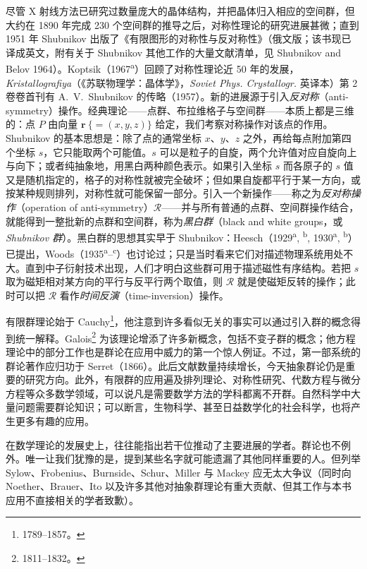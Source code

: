 尽管 X 射线方法已研究过数量庞大的晶体结构，并把晶体归入相应的空间群，但大约在 1890 年完成 230 个空间群的推导之后，对称性理论的研究进展甚微；直到 1951 年 Shubnikov 出版了《有限图形的对称性与反对称性》（俄文版；该书现已译成英文，附有关于 Shubnikov 其他工作的大量文献清单，见 Shubnikov and Belov 1964）。Koptsik（1967\textsuperscript{a}）回顾了对称性理论近 50 年的发展，\textit{Kristallografiya}（《苏联物理学：晶体学》，\textit{Soviet Phys. Crystallogr.} 英译本）第 2 卷卷首刊有 A.~V.~Shubnikov 的传略（1957）。新的进展源于引入\textit{反对称}（anti-symmetry）操作。经典理论——点群、布拉维格子与空间群——本质上都是三维的：点 $P$ 由向量 $\mathbf{r}\ \{=(x, y, z)\}$ 给定，我们考察对称操作对该点的作用。Shubnikov 的基本思想是：除了点的通常坐标 $x$、$y$、$z$ 之外，再给每点附加第四个坐标 $s$，它只能取两个可能值。$s$ 可以是粒子的自旋，两个允许值对应自旋向上与向下；或者纯抽象地，用黑白两种颜色表示。如果引入坐标 $s$ 而各原子的 $s$ 值又是随机指定的，格子的对称性就被完全破坏；但如果自旋都平行于某一方向，或按某种规则排列，对称性就可能保留一部分。引入一个新操作——称之为\textit{反对称操作}（operation of anti-symmetry）$\mathcal{R}$——并与所有普通的点群、空间群操作结合，就能得到一整批新的点群和空间群，称为\textit{黑白群}（black and white groups，或 \textit{Shubnikov 群}）。黑白群的思想其实早于 Shubnikov：Heesch（1929\textsuperscript{a}, \textsuperscript{b}, 1930\textsuperscript{a}, \textsuperscript{b}）已提出，Woods（1935\textsuperscript{a}–\textsuperscript{c}）也讨论过；只是当时看来它们对描述物理系统用处不大。直到中子衍射技术出现，人们才明白这些群可用于描述磁性有序结构。若把 $s$ 取为磁矩相对某方向的平行与反平行两个取值，则 $\mathcal{R}$ 就是使磁矩反转的操作；此时可以把 $\mathcal{R}$ 看作\textit{时间反演}（time-inversion）操作。

有限群理论始于 Cauchy\footnote{1789--1857。}，他注意到许多看似无关的事实可以通过引入群的概念得到统一解释。Galois\footnote{1811--1832。} 为该理论增添了许多新概念，包括不变子群的概念；他方程理论中的部分工作也是群论在应用中威力的第一个惊人例证。不过，第一部系统的群论著作应归功于 Serret（1866）。此后文献数量持续增长，今天抽象群论仍是重要的研究方向。此外，有限群的应用遍及排列理论、对称性研究、代数方程与微分方程等众多数学领域，可以说凡是需要数学方法的学科都离不开群。自然科学中大量问题需要群论知识；可以断言，生物科学、甚至日益数学化的社会科学，也将产生更多有趣的应用。

在数学理论的发展史上，往往能指出若干位推动了主要进展的学者。群论也不例外。唯一让我们犹豫的是，提到某些名字就可能遗漏了其他同样重要的人。但列举 Sylow、Frobenius、Burnside、Schur、Miller 与 Mackey 应无太大争议（同时向 Noether、Brauer、Ito 以及许多其他对抽象群理论有重大贡献、但其工作与本书应用不直接相关的学者致歉）。

